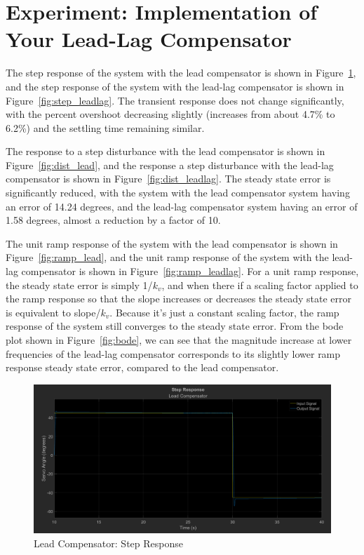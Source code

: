 \documentclass[12pt]{article}
\begin{document}
\clearpage

\section{Experiment: Implementation of Your Lead-Lag Compensator}

The step response of the system with the lead compensator is shown in Figure~\ref{fig:step_lead}, and the step response of the system with the lead-lag compensator is shown in Figure~\ref{fig:step_leadlag}. The transient response does not change significantly, with the percent overshoot decreasing slightly (increases from about 4.7\% to 6.2\%) and the settling time remaining similar.

The response to a step disturbance with the lead compensator is shown in Figure~\ref{fig:dist_lead}, and the response a step disturbance with the lead-lag compensator is shown in Figure~\ref{fig:dist_leadlag}. The steady state error is significantly reduced, with the system with the lead compensator system having an error of 14.24 degrees, and the lead-lag compensator system having an error of 1.58 degrees, almost a reduction by a factor of 10. 

The unit ramp response of the system with the lead compensator is shown in Figure~\ref{fig:ramp_lead}, and the unit ramp response of the system with the lead-lag compensator is shown in Figure~\ref{fig:ramp_leadlag}. For a unit ramp response, the steady state error is simply 1/$k_v$, and when there if a scaling factor applied to the ramp response so that the slope increases or decreases the steady state error is equivalent to slope/$k_v$. Because it's just a constant scaling factor, the ramp response of the system still converges to the steady state error. From the bode plot shown in Figure~\ref{fig:bode}, we can see that the magnitude increase at lower frequencies of the lead-lag compensator corresponds to its slightly lower ramp response steady state error, compared to the lead compensator.

\begin{figure}[h!]
	\centering
    \includegraphics[width=\textwidth]{step_lead}
    \caption{\label{fig:step_lead}Lead Compensator: Step Response}
\end{figure}
\end{document}

